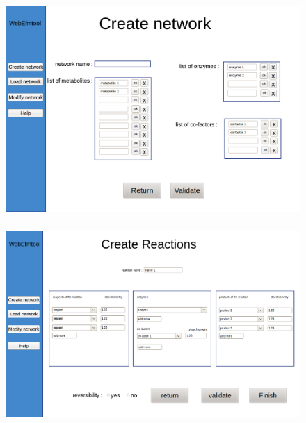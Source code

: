 \documentclass[11pt]{beamer}
\begin{document}
\begin{frame}
	\frametitle{\subsecname}
	\begin{figure}[h]
		\includegraphics[scale=0.25]{CreateNetwork.png}
	 \end{figure}
\end{frame}

\begin{frame}
	\frametitle{\subsecname}
	\begin{figure}[h]
		\includegraphics[scale=0.25]{CreateReac.png}
	 \end{figure}
\end{frame}
\end{document}
